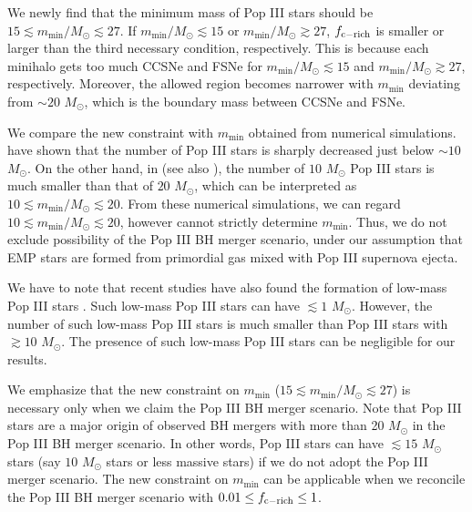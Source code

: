 \documentclass[pdftex]{pasj01}
\newcommand{\msun}{M_\odot}
\newcommand{\msmin}{m_{\min}}
\newcommand{\fcemp}{f_{\rm c-rich}}
\begin{document}
We newly find that the minimum mass of Pop III stars should be $15
\lesssim \msmin/\msun \lesssim 27$. If $\msmin/\msun \lesssim 15$ or
$\msmin/\msun \gtrsim 27$, $\fcemp$ is smaller or larger than the
third necessary condition, respectively. This is because each minihalo
gets too much CCSNe and FSNe for $\msmin/\msun \lesssim 15$ and
$\msmin/\msun \gtrsim 27$, respectively. Moreover, the allowed region
becomes narrower with $\msmin$ deviating from $\sim 20$ $\msun$, which
is the boundary mass between CCSNe and FSNe.

We compare the new constraint with $\msmin$ obtained from numerical
simulations. \citet{2014ApJ...792...32S} have shown that the number of
Pop III stars is sharply decreased just below $\sim 10$ $\msun$. On
the other hand, in \citet{2014ApJ...781...60H} (see also
\cite{2015MNRAS.448..568H}), the number of $10$ $\msun$ Pop III stars
is much smaller than that of $20$ $\msun$, which can be interpreted as
$10 \lesssim \msmin/\msun \lesssim 20$. From these numerical
simulations, we can regard $10 \lesssim \msmin/\msun \lesssim 20$,
however cannot strictly determine $\msmin$. Thus, we do not exclude
possibility of the Pop III BH merger scenario, under our assumption
that EMP stars are formed from primordial gas mixed with Pop III
supernova ejecta.

We have to note that recent studies have also found the formation of
low-mass Pop III stars \citep{2008ApJ...677..813M,
  2011ApJ...727..110C, 2011Sci...331.1040C, 2011ApJ...737...75G,
  2012MNRAS.424..399G, 2013MNRAS.435.3283M, 2014ApJ...792...32S,
  2016MNRAS.463.2781C}. Such low-mass Pop III stars can have $\lesssim
1$ $\msun$. However, the number of such low-mass Pop III stars is much
smaller than Pop III stars with $\gtrsim 10$ $\msun$. The presence of
such low-mass Pop III stars can be negligible for our results.

We emphasize that the new constraint on $\msmin$ ($15 \lesssim
\msmin/\msun \lesssim 27$) is necessary only when we claim the Pop III
BH merger scenario. Note that Pop III stars are a major origin of
observed BH mergers with more than 20 $\msun$ in the Pop III BH merger
scenario. In other words, Pop III stars can have $\lesssim 15$ $\msun$
stars (say $10$ $\msun$ stars or less massive stars) if we do not
adopt the Pop III merger scenario. The new constraint on $\msmin$ can
be applicable when we reconcile the Pop III BH merger scenario with
$0.01 \le \fcemp \le 1$.
\end{document}
